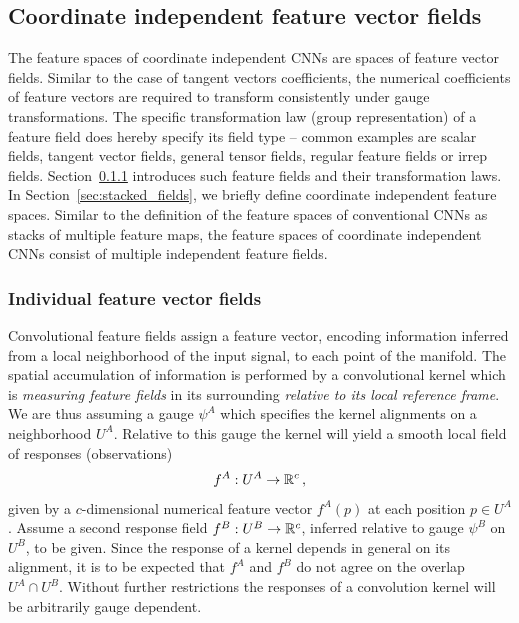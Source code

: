 

\subsection{Coordinate independent feature vector fields}
\label{sec:feature_fields}

The feature spaces of coordinate independent CNNs are spaces of feature vector fields.
Similar to the case of tangent vectors coefficients, the numerical coefficients of feature vectors are required to transform consistently under gauge transformations.
The specific transformation law (group representation) of a feature field does hereby specify its field type -- common examples are scalar fields, tangent vector fields, general tensor fields, regular feature fields or irrep fields.
Section~\ref{sec:individual_fields} introduces such feature fields and their transformation laws.
In Section~\ref{sec:stacked_fields}, we briefly define coordinate independent feature spaces.
Similar to the definition of the feature spaces of conventional CNNs as stacks of multiple feature maps, the feature spaces of coordinate independent CNNs consist of multiple independent feature fields.




\subsubsection{Individual feature vector fields}
\label{sec:individual_fields}
Convolutional feature fields assign a feature vector, encoding information inferred from a local neighborhood of the input signal, to each point of the manifold.
The spatial accumulation of information is performed by a convolutional kernel which is \emph{measuring feature fields} in its surrounding \emph{relative to its local reference frame}.
We are thus assuming a gauge $\psi^A$ which specifies the kernel alignments on a neighborhood $U^A$.
Relative to this gauge the kernel will yield a smooth local field of responses (observations)
\begin{align}
    f^A:U^A\to\mathbb{R}^c \,,
\end{align}
given by a $c$-dimensional numerical feature vector $f^A(p)$ at each position $p\in U^A$.
Assume a second response field $f^B:U^B\to\mathbb{R}^c$, inferred relative to gauge $\psi^B$ on $U^B$, to be given.
Since the response of a kernel depends in general on its alignment, it is to be expected that $f^A$ and $f^B$ do not agree on the overlap $U^A\cap U^B.$
Without further restrictions the responses of a convolution kernel will be arbitrarily gauge dependent.

